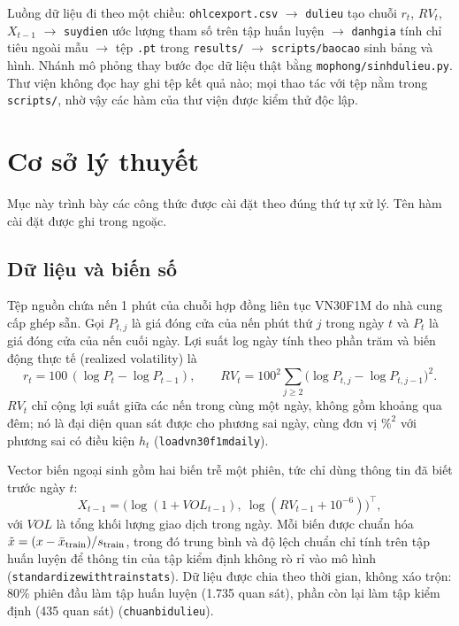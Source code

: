 \documentclass[11pt,a4paper]{article}
\renewcommand{\_}{\gachduoi\allowbreak}
\newcommand{\tep}[1]{\texttt{#1}}
\newcommand{\ham}[1]{\texttt{#1}}
\begin{document}
Luồng dữ liệu đi theo một chiều: \tep{ohlc\_export.csv} $\to$ \tep{du\_lieu} tạo chuỗi $r_t$, $RV_t$, $X_{t-1}$ $\to$ \tep{suy\_dien} ước lượng tham số trên tập huấn luyện $\to$ \tep{danh\_gia} tính chỉ tiêu ngoài mẫu $\to$ tệp \tep{.pt} trong \tep{results/} $\to$ \tep{scripts/bao\_cao} sinh bảng và hình. Nhánh mô phỏng thay bước đọc dữ liệu thật bằng \tep{mo\_phong/sinh\_du\_lieu.py}. Thư viện không đọc hay ghi tệp kết quả nào; mọi thao tác với tệp nằm trong \tep{scripts/}, nhờ vậy các hàm của thư viện được kiểm thử độc lập.

\section{Cơ sở lý thuyết}
Mục này trình bày các công thức được cài đặt theo đúng thứ tự xử lý. Tên hàm cài đặt được ghi trong ngoặc.

\subsection{Dữ liệu và biến số}\label{sec:du-lieu}
Tệp nguồn chứa nến 1 phút của chuỗi hợp đồng liên tục VN30F1M do nhà cung cấp ghép sẵn. Gọi $P_{t,j}$ là giá đóng cửa của nến phút thứ $j$ trong ngày $t$ và $P_t$ là giá đóng cửa của nến cuối ngày. Lợi suất log ngày tính theo phần trăm và biến động thực tế (realized volatility) là
\begin{equation}\label{eq:rv}
r_t = 100\,(\log P_t-\log P_{t-1}),\qquad
RV_t = 100^2\sum_{j\ge 2}\bigl(\log P_{t,j}-\log P_{t,j-1}\bigr)^2 .
\end{equation}
$RV_t$ chỉ cộng lợi suất giữa các nến trong cùng một ngày, không gồm khoảng qua đêm; nó là đại diện quan sát được cho phương sai ngày, cùng đơn vị $\%^2$ với phương sai có điều kiện $h_t$ (\ham{load\_vn30f1m\_daily}).

Vector biến ngoại sinh gồm hai biến trễ một phiên, tức chỉ dùng thông tin đã biết trước ngày $t$:
\begin{equation}
X_{t-1} = \bigl(\log(1+VOL_{t-1}),\ \log(RV_{t-1}+10^{-6})\bigr)^{\!\top},
\end{equation}
với $VOL$ là tổng khối lượng giao dịch trong ngày. Mỗi biến được chuẩn hóa $\tilde x=(x-\bar x_{\rm train})/s_{\rm train}$, trong đó trung bình và độ lệch chuẩn chỉ tính trên tập huấn luyện để thông tin của tập kiểm định không rò rỉ vào mô hình (\ham{standardize\_with\_train\_stats}). Dữ liệu được chia theo thời gian, không xáo trộn: 80\% phiên đầu làm tập huấn luyện (1.735 quan sát), phần còn lại làm tập kiểm định (435 quan sát) (\ham{chuan\_bi\_du\_lieu}).
\end{document}
